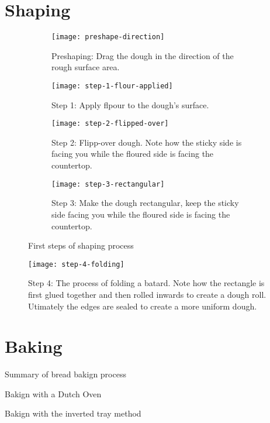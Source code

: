\documentclass[paper=a4, twoside=false, fontsize=12pt]{scrbook}
\begin{document}
\section*{Shaping}
\begin{flowchart}[!htb]

\end{flowchart}

\begin{figure*}[!htb]
\begin{subfigure}{.475\linewidth}
  \texttt{[image: preshape-direction]}
  \caption*{Preshaping: Drag the dough in the direction of the rough surface
  area.}%
\end{subfigure}
\begin{subfigure}{.475\linewidth}
  \texttt{[image: step-1-flour-applied]}
  \caption*{Step 1: Apply flpour to the dough's surface.}%
\end{subfigure}\hfill %
\medskip %
\begin{subfigure}{.475\linewidth}
  \texttt{[image: step-2-flipped-over]}
  \caption*{Step 2: Flipp-over dough. Note how the sticky side is facing you
  while the floured side is facing the countertop.}
\end{subfigure}\hfill %
\begin{subfigure}{.475\linewidth}
  \texttt{[image: step-3-rectangular]}
  \caption*{Step 3: Make the dough rectangular, keep the sticky side facing
  you while the floured side is facing the countertop.}%
\end{subfigure}
\caption*{First steps of shaping process}
\end{figure*}

\begin{figure*}[htb!]
  \texttt{[image: step-4-folding]}
  \caption*{Step 4: The process of folding a batard.  Note how the rectangle
  is first glued together and then rolled inwards to create a dough roll.
  Utimately the edges are sealed to create a more uniform dough.}%
\end{figure*}
\clearpage{}

\section*{Baking}
\begin{flowchart}[!htb]

\caption*{Summary of bread bakign process}
\end{flowchart}

\begin{flowchart*}[!htb]

\caption*{Bakign with a Dutch Oven}
\end{flowchart*}

\begin{flowchart}[!htb]

\caption*{Bakign with the inverted tray method}
\end{flowchart}
\clearpage{}
\end{document}
